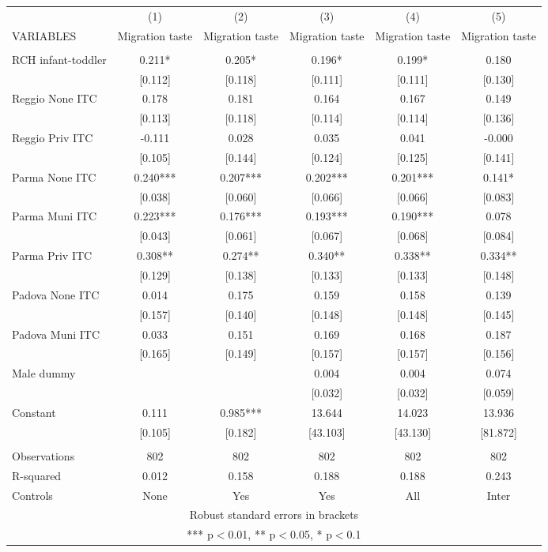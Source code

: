 \begin{tabular}{lccccc} \hline
 & (1) & (2) & (3) & (4) & (5) \\
VARIABLES & Migration taste & Migration taste & Migration taste & Migration taste & Migration taste \\ \hline
 &  &  &  &  &  \\
RCH infant-toddler & 0.211* & 0.205* & 0.196* & 0.199* & 0.180 \\
 & [0.112] & [0.118] & [0.111] & [0.111] & [0.130] \\
Reggio None ITC & 0.178 & 0.181 & 0.164 & 0.167 & 0.149 \\
 & [0.113] & [0.118] & [0.114] & [0.114] & [0.136] \\
Reggio Priv ITC & -0.111 & 0.028 & 0.035 & 0.041 & -0.000 \\
 & [0.105] & [0.144] & [0.124] & [0.125] & [0.141] \\
Parma None ITC & 0.240*** & 0.207*** & 0.202*** & 0.201*** & 0.141* \\
 & [0.038] & [0.060] & [0.066] & [0.066] & [0.083] \\
Parma Muni ITC & 0.223*** & 0.176*** & 0.193*** & 0.190*** & 0.078 \\
 & [0.043] & [0.061] & [0.067] & [0.068] & [0.084] \\
Parma Priv ITC & 0.308** & 0.274** & 0.340** & 0.338** & 0.334** \\
 & [0.129] & [0.138] & [0.133] & [0.133] & [0.148] \\
Padova None ITC & 0.014 & 0.175 & 0.159 & 0.158 & 0.139 \\
 & [0.157] & [0.140] & [0.148] & [0.148] & [0.145] \\
Padova Muni ITC & 0.033 & 0.151 & 0.169 & 0.168 & 0.187 \\
 & [0.165] & [0.149] & [0.157] & [0.157] & [0.156] \\
Male dummy &  &  & 0.004 & 0.004 & 0.074 \\
 &  &  & [0.032] & [0.032] & [0.059] \\
Constant & 0.111 & 0.985*** & 13.644 & 14.023 & 13.936 \\
 & [0.105] & [0.182] & [43.103] & [43.130] & [81.872] \\
 &  &  &  &  &  \\
Observations & 802 & 802 & 802 & 802 & 802 \\
R-squared & 0.012 & 0.158 & 0.188 & 0.188 & 0.243 \\
 Controls & None & Yes & Yes & All & Inter \\ \hline
\multicolumn{6}{c}{ Robust standard errors in brackets} \\
\multicolumn{6}{c}{ *** p$<$0.01, ** p$<$0.05, * p$<$0.1} \\
\end{tabular}
